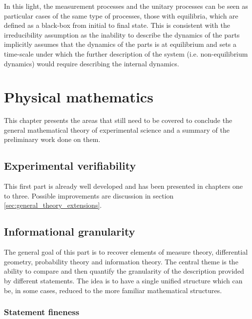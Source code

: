 \documentclass[11pt,letterpaper,fleqn]{memoir} %
\begin{document}
In this light, the measurement processes and the unitary processes can be seen as particular cases of the same type of processes, those with equilibria, which are defined as a black-box from initial to final state. This is consistent with the irreducibility assumption as the inability to describe the dynamics of the parts implicitly assumes that the dynamics of the parts is at equilibrium and sets a time-scale under which the further description of the system (i.e. non-equilibrium dynamics) would require describing the internal dynamics.


\def\eqgran{\doteq}
\def\finer{\leqdot}
\def\nfiner{\nleqdot}
\def\coarser{\geqdot}
\def\ncoarser{\ngeqdot}
\def\sfiner{\lessdot}
\def\scoarser{\gtrdot}

\chapter{Physical mathematics}

This chapter presents the areas that still need to be covered to conclude the general mathematical theory of experimental science and a summary of the preliminary work done on them.

\section{Experimental verifiability}

This first part is already well developed and has been presented in chapters one to three. Possible improvements are discussion in section \ref{sec:general_theory_extensions}.


\section{Informational granularity}

The general goal of this part is to recover elements of measure theory, differential geometry, probability theory and information theory. The central theme is the ability to compare and then quantify the granularity of the description provided by different statements. The idea is to have a single unified structure which can be, in some cases, reduced to the more familiar mathematical structures.

\subsection{Statement fineness}
\end{document}
